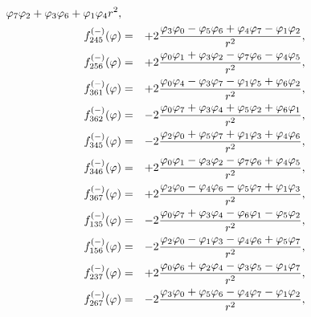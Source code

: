 \documentclass[a4paper,12pt]{book}
\begin{document}
\begin{eqnarray}
{{{\varphi _{7}}{\varphi _{2}}+{\varphi _{3}}{\varphi _{6}}+{\varphi _{1}}{%
\varphi _{4}}}{r^{2}},}  \nonumber \\
{{f}_{245}^{(-)}{(\varphi )}} &=&+2{\frac{{\varphi _{3}}{\varphi _{0}}-{%
\varphi _{5}}{\varphi _{6}}+{\varphi _{4}}{\varphi _{7}}-{\varphi
_{1}\varphi _{2}}}{r^{2}},}  \nonumber \\
{\quad {f}_{256}^{(-)}{(\varphi )}} &=&+2{\frac{{\varphi _{0}}{\varphi _{1}}+%
{\varphi _{3}}{\varphi _{2}}-{\varphi _{7}}{\varphi _{6}}-{\varphi _{4}}{%
\varphi _{5}}}{r^{2}},}  \nonumber \\
{{f}_{361}^{(-)}{(\varphi )}} &=&+2{\frac{{\varphi _{0}}{\varphi _{4}}-{%
\varphi _{3}}{\varphi _{7}}-{\varphi _{1}}{\varphi _{5}}+{\varphi
_{6}\varphi _{2}}}{r^{2}},}  \nonumber \\
{\quad {f}_{362}^{(-)}{(\varphi )}} &=&-2{\frac{{\varphi _{0}}{\varphi _{7}}+%
{\varphi _{3}}{\varphi _{4}}+{\varphi _{5}}{\varphi _{2}}+{\varphi _{6}}{%
\varphi _{1}}}{r^{2}},}  \nonumber \\
{{f}_{345}^{(-)}{(\varphi )}} &=&-2{\frac{{\varphi _{2}}{\varphi _{0}}+{%
\varphi _{5}}{\varphi _{7}}+{\varphi _{1}}{\varphi _{3}}+{\varphi
_{4}\varphi _{6}}}{r^{2}},}  \nonumber \\
{\quad {f}_{346}^{(-)}{(\varphi )}} &=&+2{\frac{{\varphi _{0}}{\varphi _{1}}-%
{\varphi _{3}}{\varphi _{2}}-{\varphi _{7}}{\varphi _{6}}+{\varphi _{4}}{%
\varphi _{5}}}{r^{2}},}  \nonumber \\
{{f}_{367}^{(-)}{(\varphi )}} &=&+2{\frac{{\varphi _{2}}{\varphi _{0}}-{%
\varphi _{4}}{\varphi _{6}}-{\varphi _{5}}{\varphi _{7}}+{\varphi
_{1}\varphi _{3}}}{{r^{2}}},}  \nonumber \\
{\quad {f}_{135}^{(-)}{(\varphi )}} &=&-2{\frac{{\varphi _{0}}{\varphi _{7}}+%
{\varphi _{3}}{\varphi _{4}}-{\varphi _{6}}{\varphi _{1}}-{\varphi _{5}}{%
\varphi _{2}}}{r^{2}},}  \nonumber \\
{{f}_{156}^{(-)}{(\varphi )}} &=&-2{\frac{{\varphi _{2}}{\varphi _{0}}-{%
\varphi _{1}}{\varphi _{3}}-{\varphi _{4}}{\varphi _{6}}+{\varphi
_{5}\varphi _{7}}}{r^{2}},}  \nonumber \\
{\quad {f}_{237}^{(-)}{(\varphi )}} &=&+2{\frac{{\varphi _{0}}{\varphi _{6}}+%
{\varphi _{2}}{\varphi _{4}}-{\varphi _{3}}{\varphi _{5}}-{\varphi _{1}}{%
\varphi _{7}}}{r^{2}},}  \nonumber \\
{{f}_{267}^{(-)}{(\varphi )}} &=&-2{\frac{{\varphi _{3}}{\varphi _{0}}+{%
\varphi _{5}}{\varphi _{6}}-{\varphi _{4}}{\varphi _{7}}-{\varphi
_{1}\varphi _{2}}}{r^{2}},}  \nonumber \\

\end{eqnarray}
\end{document}
